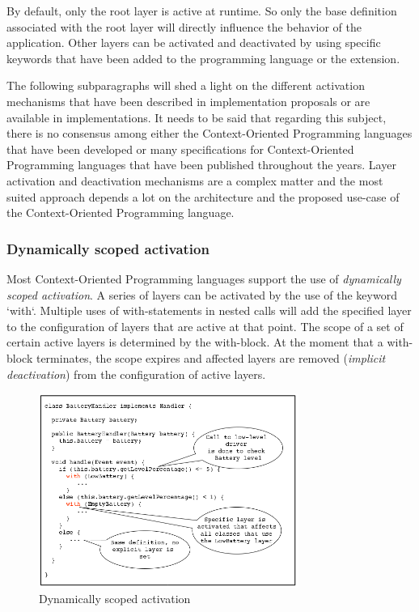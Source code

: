 \documentclass{acm_proc_article-sp}
\begin{document}
By default, only the root layer is active at runtime. So only the base definition associated with the root layer will directly influence the behavior of the application. Other layers can be activated and deactivated by using specific keywords that have been added to the programming language or the extension. 

The following subparagraphs will shed a light on the different activation mechanisms that have been described in implementation proposals or are available in implementations. It needs to be said that regarding this subject, there is no consensus among either the Context-Oriented Programming languages that have been developed or many specifications for Context-Oriented Programming languages that have been published throughout the years. Layer activation and deactivation mechanisms are a complex matter and the most suited approach depends a lot on the architecture and the proposed use-case of the Context-Oriented Programming language.

\subsubsection{Dynamically scoped activation}
\label{dynamically_scoped_activation}
Most Context-Oriented Programming languages support the use of \textit{dynamically scoped activation}. A series of layers can be activated by the use of the keyword `with`. Multiple uses of with-statements in nested calls will add the specified layer to the configuration of layers that are active at that point. The scope of a set of certain active layers is determined by the with-block. At the moment that a with-block terminates, the scope expires and affected layers are removed (\textit{implicit deactivation}) from the configuration of active layers. 

\begin{figure}[H]
\centering
\includegraphics[width=85mm]{dynamic_activation_toy.png}
\caption{Dynamically scoped activation}
\label{fig:dynamically_scoped_activation}
\end{figure}
\end{document}
